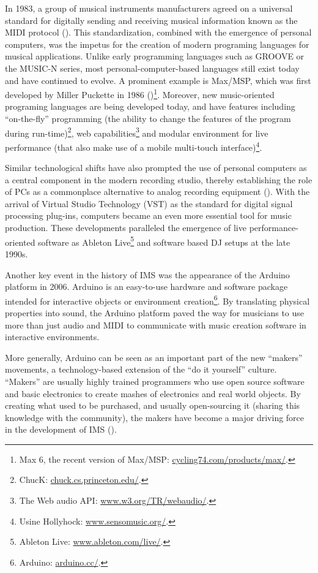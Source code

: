 \documentclass[a4paper,11pt]{article}
\begin{document}
In 1983, a group of musical instruments manufacturers agreed on a universal standard for digitally sending and receiving musical information known as the MIDI protocol (\cite{web:quinn}).
This standardization, combined with the emergence of personal computers, was the impetus for the creation of modern programing languages for musical applications.
Unlike early programming languages such as GROOVE or the MUSIC-N series, most personal-computer-based languages still exist today and have continued to evolve.
A prominent example is Max/MSP, which was first developed by Miller Puckette in 1986 (\cite[p. 16]{winkler01})\footnote{Max 6, the recent version of Max/MSP: \href{http://cycling74.com/products/max/}{cycling74.com/products/max/}.}.
Moreover, new music-oriented programing languages are being developed today, and have features including ``on-the-fly'' programming (the ability to change the features of the program during run-time)\footnote{ChucK: \href{http://chuck.cs.princeton.edu/}{chuck.cs.princeton.edu/}.}, web capabilities\footnote{The Web audio API: \href{http://www.w3.org/TR/webaudio/}{www.w3.org/TR/webaudio/}.} and modular environment for live performance (that also make use of a mobile multi-touch interface)\footnote{Usine Hollyhock: \href{http://www.sensomusic.org/}{www.sensomusic.org/}.}.

Similar technological shifts have also prompted the use of personal computers as a central component in the modern recording studio, thereby establishing the role of PCs as a commonplace alternative to analog recording equipment (\cite{leider:04}).
With the arrival of Virtual Studio Technology (VST) as the standard for digital signal processing plug-ins, computers became an even more essential tool for music production.
These developments paralleled the emergence of live performance-oriented software as Ableton Live\footnote{Ableton Live: \href{http://www.ableton.com/en/live/}{www.ableton.com/live/}.} and software based DJ setups at the late 1990s.

Another key event in the history of IMS was the appearance of the Arduino platform in 2006.
Arduino is an easy-to-use hardware and software package intended for interactive objects or environment creation\footnote{Arduino: \href{http://arduino.cc/}{arduino.cc/}.}.
By translating physical properties into sound, the Arduino platform paved the way for musicians to use more than just audio and MIDI to communicate with music creation software in interactive environments.

More generally, Arduino can be seen as an important part of the new ``makers'' movements, a technology-based extension of the ``do it yourself'' culture.
``Makers'' are usually highly trained programmers who use open source software and basic electronics to create mashes of electronics and real world objects.
By creating what used to be purchased, and usually open-sourcing it (sharing this knowledge with the community), the makers have become a major driving force in the development of IMS (\cite{web:kirn12}).
\end{document}
